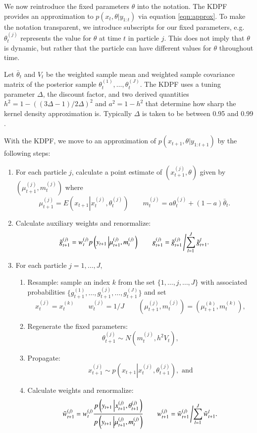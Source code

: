 \documentclass{elsarticle}
\begin{document}
We now reintroduce the fixed parameters $\theta$ into the notation. The KDPF provides an approximation to $p(x_t,\theta| y_{1:t})$ via equation \eqref{eqn:approx}. To make the notation transparent, we introduce subscripts for our fixed parameters, e.g. $\theta_t^{(j)}$ represents the value for $\theta$ at time $t$ in particle $j$. This does not imply that $\theta$ is dynamic, but rather that the particle can have different values for $\theta$ throughout time.

Let $\bar{\theta}_t$ and $V_t$ be the weighted sample mean and weighted sample covariance matrix of the posterior sample $\theta_t^{(1)},\ldots,\theta_t^{(J)}$.  The KDPF uses a tuning parameter $\Delta$, the discount factor, and two derived quantities $h^2 = 1 - ((3\Delta - 1)/2\Delta)^2$ and $a^2 = 1 - h^2$ that determine how sharp the kernel density approximation is. Typically $\Delta$ is taken to be between 0.95 and 0.99 \citep{Liu:West:comb:2001}.

With the KDPF, we move to an approximation of $p(x_{t+1},\theta|y_{1:t+1})$ by the following steps:

\begin{enumerate}
\item For each particle $j$, calculate a point estimate of $\left(x_{t+1}^{(j)},\theta\right)$ given by $\left(\mu_{t+1}^{(j)},m_t^{(j)}\right)$ where
    \[
    \mu_{t+1}^{(j)} = E\left(x_{t+1}\left|x_t^{(j)},\theta_t^{(j)} \right.\right) \qquad
    m_t^{(j)} = a\theta_t^{(j)} + (1-a)\bar{\theta}_t.
    \]
\item Calculate auxiliary weights and renormalize:
\[ \tilde{g}_{t+1}^{(j)} = w_t^{(j)} p\left(y_{t+1}\left|\mu_{t+1}^{(j)},m_t^{(j)}\right.\right) \qquad g_{t+1}^{(j)} = \tilde{g}_{t+1}^{(j)}\left/ \sum_{l=1}^J \tilde{g}_{t+1}^l. \right. \]
\item For each particle $j=1,\ldots,J$,
	\begin{enumerate}
    \item Resample: sample an index $k$ from the set $\{1,\ldots,j,\ldots,J\}$ with associated probabilities $\{g_{t+1}^{(1)},\ldots,g_{t+1}^{(j)},\ldots,g_{t+1}^{(J)}\}$ and set \[x_t^{(j)} = x_t^{(k)} \qquad w_t^{(j)} = 1 / J \qquad \left(\mu_{t+1}^{(j)},m_t^{(j)}\right) = \left(\mu_{t+1}^{(k)},m_t^{(k)}\right),\]
	\item Regenerate the fixed parameters:
	\[ \theta_{t+1}^{(j)} \sim N\left( m_t^{(j)}, h^2V_t \right), \]
	\item Propagate:
	\[ x_{t+1}^{(j)} \sim p\left(x_{t+1}\left|x_t^{(j)},\theta_{t+1}^{(j)}\right.\right), \mbox{ and} \]
	\item Calculate weights and renormalize:
	\[ \tilde{w}_{t+1}^{(j)} = w_t^{(j)}\frac{p\left(y_{t+1}\left|x_{t+1}^{(j)},\theta_{t+1}^{(j)}\right.\right)}{p\left(y_{t+1}\left|\mu_{t+1}^{(j)},m_t^{(j)}\right.\right)}
	\qquad
	w_{t+1}^{(j)} = \tilde{w}_{t+1}^{(j)}\left/\sum_{l=1}^J \tilde{w}_{t+1}^l. \right. \]
	\end{enumerate}
\end{enumerate}
\end{document}
